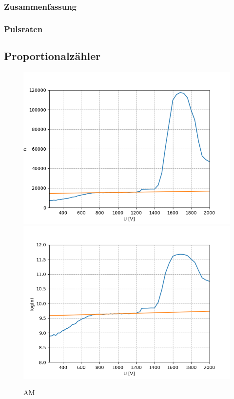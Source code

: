 \documentclass[12pt,a4paper]{article}
\begin{document}
\subsubsection{Zusammenfassung}

\subsubsection{Pulsraten}

\subsection{Proportionalzähler}
\begin{figure}
\centering
\includegraphics[scale=0.8]{Bilder/Prop/Ch_lin.PNG}
\includegraphics[scale=0.8]{Bilder/Prop/Ch_log.PNG}
\caption{AM}
\label{fig:amlin}
\end{figure}
\end{document}
